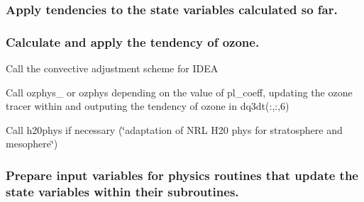 \subsubsection*{Apply tendencies to the state variables calculated so far.}

\subsubsection*{Calculate and apply the tendency of ozone.}


\begin{DoxyItemize}
\item Call the convective adjustment scheme for I\+D\+EA
\item Call \textquotesingle{}ozphys\+\_\textquotesingle{} or \textquotesingle{}ozphys\textquotesingle{} depending on the value of pl\+\_\+coeff, updating the ozone tracer within and outputing the tendency of ozone in dq3dt(\+:,\+:,6)
\item Call \textquotesingle{}h20phys\textquotesingle{} if necessary (\char`\"{}adaptation of N\+R\+L H20 phys for stratosphere and mesophere\char`\"{})
\end{DoxyItemize}

\subsubsection*{Prepare input variables for physics routines that update the state variables within their subroutines.}


